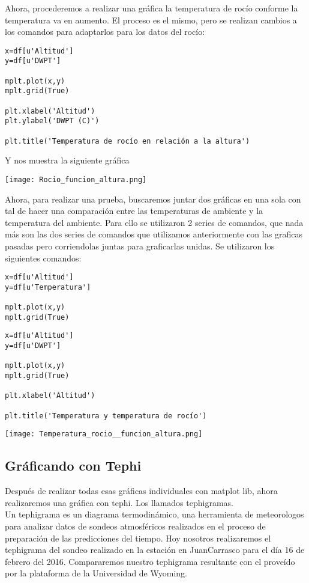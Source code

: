 \documentclass{article}
\begin{document}
Ahora, procederemos a realizar una gráfica la temperatura de rocío conforme la temperatura va en aumento. El proceso es el mismo, pero se realizan cambios a los comandos para adaptarlos para los datos del rocío:
\begin{verbatim}
x=df[u'Altitud']
y=df[u'DWPT']

mplt.plot(x,y)
mplt.grid(True)

plt.xlabel('Altitud')
plt.ylabel('DWPT (C)')

plt.title('Temperatura de rocío en relación a la altura')
\end{verbatim}
Y nos muestra la siguiente gráfica
\begin{center}
\texttt{[image: Rocio\_funcion\_altura.png]}
\end{center}
Ahora, para realizar una prueba, buscaremos juntar dos gráficas en una sola con tal de hacer una comparación entre las temperaturas de ambiente y la temperatura del ambiente. Para ello se utilizaron 2 series de comandos, que nada más son las dos series de comandos que utilizamos anteriormente con las graficas pasadas pero corriendolas juntas para graficarlas unidas. Se utilizaron los siguientes comandos:
\begin{verbatim}
x=df[u'Altitud']
y=df[u'Temperatura']

mplt.plot(x,y)
mplt.grid(True)
\end{verbatim}
\begin{verbatim}
x=df[u'Altitud']
y=df[u'DWPT']

mplt.plot(x,y)
mplt.grid(True)

plt.xlabel('Altitud')

plt.title('Temperatura y temperatura de rocío')
\end{verbatim}
\begin{center}
\texttt{[image: Temperatura\_rocio\_\_funcion\_altura.png]}
\end{center}
\newpage
\subsection{\huge Gráficando con Tephi}
Después de realizar todas esas gráficas individuales con matplot lib, ahora realizaremos una gráfica con tephi. Los llamados tephigramas.\\
Un tephigrama es un diagrama termodinámico, una herramienta de meteorologos para analizar datos de sondeos atmosféricos realizados en el proceso de preparación de las predicciones del tiempo. Hoy nosotros realizaremos el tephigrama del sondeo realizado en la estación en JuanCarrasco para el día 16 de febrero del 2016. Compararemos nuestro tephigrama resultante con el proveído por la plataforma de la Universidad de Wyoming.\\
\end{document}
